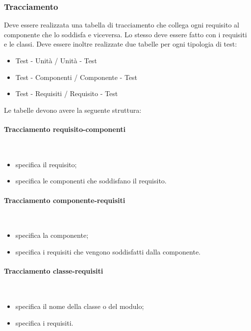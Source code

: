 \subsubsection{Tracciamento}
Deve essere realizzata una tabella di tracciamento che collega ogni requisito al componente che lo soddisfa e viceversa. Lo stesso deve essere fatto con i requisiti e le classi.
Deve essere inoltre realizzate due tabelle per ogni tipologia di test:
\begin{itemize}
\item Test - Unità / Unità - Test
\item Test - Componenti / Componente - Test
\item Test - Requisiti / Requisito - Test
\end{itemize}

Le tabelle devono avere la seguente struttura:

\paragraph{Tracciamento requisito-componenti} \hfill \\
\begin{itemize}
\item {}specifica il requisito;
\item {}specifica le componenti che soddisfano il requisito.
\end{itemize}

\paragraph{Tracciamento componente-requisiti} \hfill \\

\begin{itemize}
\item {}specifica la componente;
\item {}specifica i requisiti che vengono soddisfatti dalla componente.
\end{itemize}

\paragraph{Tracciamento classe-requisiti} \hfill \\
\begin{itemize}
\item {}specifica il nome della classe o del modulo;
\item {}specifica i requisiti.
\end{itemize}

